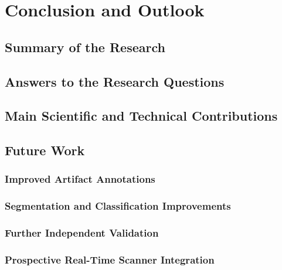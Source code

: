 \chapter{Conclusion and Outlook}
\section{Summary of the Research}
\section{Answers to the Research Questions}
\section{Main Scientific and Technical Contributions}
\section{Future Work}
\subsection{Improved Artifact Annotations}
\subsection{Segmentation and Classification Improvements}
\subsection{Further Independent Validation}
\subsection{Prospective Real-Time Scanner Integration}
